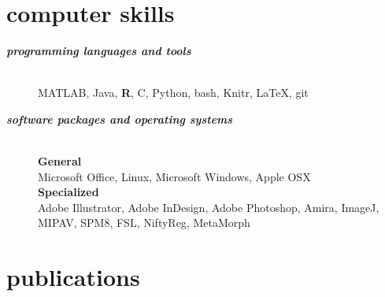 \documentclass[]{friggeri-cv} %
\begin{document}
\section{computer skills}
\begin{description}
   \item[\textbf{\textit{programming languages and tools}}] \hfill \\  
	 MATLAB, Java, \textbf{R}, C, Python, bash, Knitr, \LaTeX, git
   \item[\textbf{\textit{software packages and operating systems}}] \hfill \\
	    \textbf{General} \\
	    Microsoft Office, Linux, Microsoft Windows, Apple OSX \\
	    \textbf{Specialized} \\
	    Adobe Illustrator, Adobe InDesign, Adobe Photoshop, Amira, ImageJ, MIPAV, SPM8, FSL, NiftyReg, MetaMorph 
\end{description}



\section{publications}



\begin{refsection} %
\nocite{*}
\printbibliography[sorting=chronological, type=inproceedings, title={conference proceedings}, notkeyword={france}, heading=subbibliography]
\end{refsection}
\end{document}
